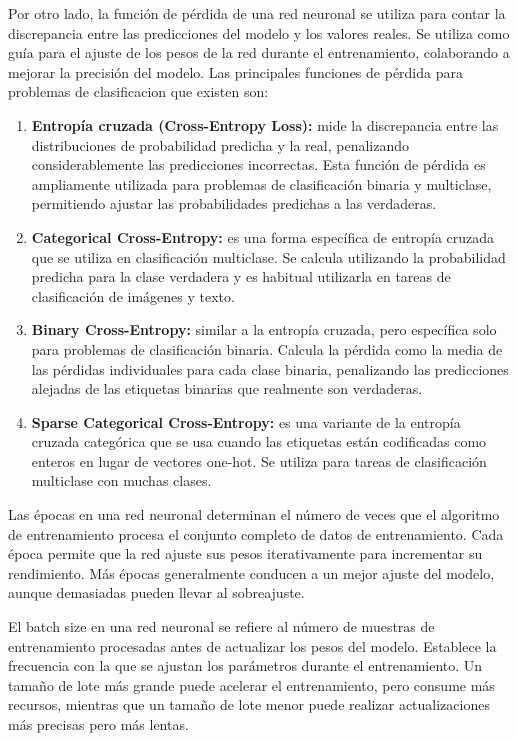 Por otro lado, la función de pérdida de una red neuronal se utiliza para contar la discrepancia entre las predicciones del modelo y los valores reales. Se utiliza como guía para el ajuste de los pesos de la red durante el entrenamiento, colaborando a mejorar la precisión del modelo. Las principales funciones de pérdida para problemas de clasificacion que existen son:
\begin{enumerate}
    \item \textbf{Entropía cruzada (Cross-Entropy Loss):}
mide la discrepancia entre las distribuciones de probabilidad predicha y la real, penalizando considerablemente las predicciones incorrectas. Esta función de pérdida es ampliamente utilizada para problemas de clasificación binaria y multiclase, permitiendo ajustar las probabilidades predichas a las verdaderas.

\item \textbf{Categorical Cross-Entropy:}
es una forma específica de entropía cruzada que se utiliza en clasificación multiclase. Se calcula utilizando la probabilidad predicha para la clase verdadera y es habitual utilizarla en tareas de clasificación de imágenes y texto.

\item \textbf{Binary Cross-Entropy:}
similar a la entropía cruzada, pero específica solo para problemas de clasificación binaria. Calcula la pérdida como la media de las pérdidas individuales para cada clase binaria, penalizando las predicciones alejadas de las etiquetas binarias que realmente son verdaderas.

\item \textbf{Sparse Categorical Cross-Entropy:}
es una variante de la entropía cruzada categórica que se usa cuando las etiquetas están codificadas como enteros en lugar de vectores one-hot. Se utiliza para tareas de clasificación multiclase con muchas clases.
\end{enumerate}

Las épocas en una red neuronal determinan el número de veces que el algoritmo de entrenamiento procesa el conjunto completo de datos de entrenamiento. Cada época permite que la red ajuste sus pesos iterativamente para incrementar su rendimiento. Más épocas generalmente conducen a un mejor ajuste del modelo, aunque demasiadas pueden llevar al sobreajuste.

El batch size en una red neuronal se refiere al número de muestras de entrenamiento procesadas antes de actualizar los pesos del modelo. Establece la frecuencia con la que se ajustan los parámetros durante el entrenamiento. Un tamaño de lote más grande puede acelerar el entrenamiento, pero consume más recursos, mientras que un tamaño de lote menor puede realizar actualizaciones más precisas pero más lentas.

